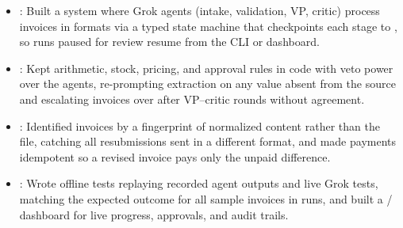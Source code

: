 \begin{itemize}
  \item {}: Built a  system where  Grok agents (intake, validation, VP, critic) process invoices in  formats via a typed state machine that checkpoints each stage to , so runs paused for review resume from the CLI or dashboard.
  \item {}: Kept arithmetic, stock, pricing, and approval rules in code with veto power over the agents, re-prompting extraction on any value absent from the source and escalating invoices over  after  VP--critic rounds without agreement.
  \item {}: Identified invoices by a  fingerprint of normalized content rather than the file, catching all  resubmissions sent in a different format, and made payments idempotent so a revised invoice pays only the unpaid difference.
  \item {}: Wrote  offline tests replaying recorded agent outputs and  live Grok tests, matching the expected outcome for all  sample invoices in  runs, and built a / dashboard for live progress, approvals, and audit trails.
\end{itemize}
